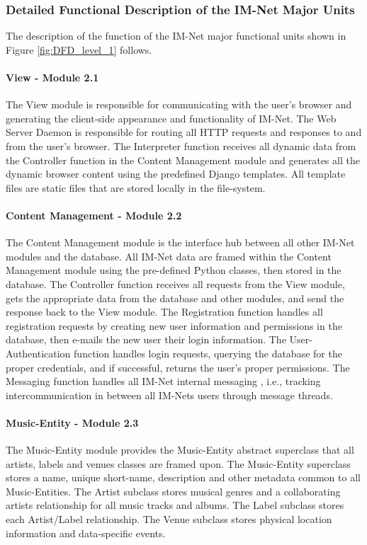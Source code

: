 \documentclass[letterpaper,12pt]{article}
\begin{document}
{\textcolor{subsubsection}{\subsubsection{Detailed Functional Description of the IM-Net Major Units}}

The description of the function of the IM-Net major functional units shown in Figure \ref{fig:DFD_level_1} follows.

\paragraph{View - Module 2.1}
The View module is responsible for communicating with the user's browser and generating the client-side appearance and functionality of IM-Net. The Web Server Daemon is responsible for routing all HTTP requests and responses to and from the user's browser. The Interpreter function receives all dynamic data from the Controller function in the Content Management module and generates all the dynamic browser content using the predefined Django templates. All template files are static files that are stored locally in the file-system.

\paragraph{Content Management - Module 2.2}
The Content Management module is the interface hub between all other IM-Net modules and the database. All IM-Net data are framed within the Content Management module using the pre-defined Python classes, then stored in the database. The Controller function receives all requests from the View module, gets the appropriate data from the database and other modules, and send the response back to the View module. The Registration function handles all registration requests by creating new user information and permissions in the database, then e-mails the new user their login information. The User-Authentication function handles login requests, querying the database for the proper credentials, and if successful, returns the user's proper permissions. The Messaging function handles all IM-Net internal messaging , i.e., tracking intercommunication in between all IM-Nets users through message threads.

\paragraph{Music-Entity - Module 2.3}
The Music-Entity module provides the Music-Entity abstract superclass that all artists, labels and venues classes are framed upon. The Music-Entity superclass stores a name, unique short-name, description and other metadata common to all Music-Entities. The Artist subclass stores musical genres and a collaborating artists relationship for all music tracks and albums. The Label subclass stores each Artist/Label relationship. The Venue subclass stores physical location information and data-specific events.

}
\end{document}
